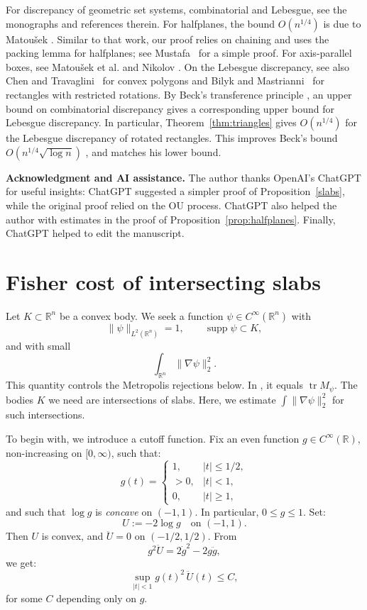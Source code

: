 \documentclass[12pt,reqno]{amsart}
\def\le{\leqslant}
\def\ge{\geqslant}\def\geq{\geqslant}
\def\le{\leqslant}
\theoremstyle{remark}
\numberwithin{equation}{section}
\def \R {\mathbb{R}}
\begin{document}
For discrepancy of geometric set systems, combinatorial and Lebesgue, see the monographs \cite{Mat, Chaz, Beck-Chen} and references therein. For halfplanes, the bound \(O(n^{1/4})\) is due to Matou\v{s}ek \cite{Mat-halfspaces}. Similar to that work, our proof relies on chaining and uses the packing lemma for halfplanes; see Mustafa~\cite{Mustafa} for a simple proof. For axis-parallel boxes, see Matou\v{s}ek et al. \cite{MNT} and 
Nikolov \cite{Nikolov}. On the Lebesgue discrepancy, see also Chen and Travaglini~\cite{ChenTrav} for convex polygons and Bilyk and Mastrianni~\cite{BilykMast} for rectangles with restricted rotations. By Beck's transference principle \cite{Beck-1}, an upper bound on combinatorial discrepancy gives a corresponding upper bound for Lebesgue discrepancy. In particular, Theorem~\ref{thm:triangles} gives \(O(n^{1/4})\) for the Lebesgue discrepancy of rotated rectangles. This improves Beck's bound \(O(n^{1/4}\sqrt{\log n})\) \cite{Beck-Chen}, and matches his lower bound.
\smallskip%

\textbf{Acknowledgment and AI assistance.} 
The author thanks OpenAI's ChatGPT for useful insights: ChatGPT suggested a simpler proof of Proposition~\ref{slabs}, while the original proof relied on the OU process. ChatGPT also helped the author with estimates in the proof of Proposition~\ref{prop:halfplanes}. Finally, ChatGPT helped to edit the manuscript.


\section{Fisher cost of intersecting slabs}\label{sec:slabs}

Let \(K\subset\R^n\) be a convex body. We seek a function \(\psi\in C^\infty(\R^n)\) with
\[
\|\psi\|_{L^2(\R^n)}=1,\qquad
\operatorname{supp}\psi\subset K,
\]
and with small
\[
\int_{\R^n}\|\nabla\psi\|_2^2.
\]
This quantity controls the Metropolis rejections below. In \cite{Versh-Sm-3}, it equals \(\operatorname{tr}M_\psi\). The bodies \(K\) we need are intersections of slabs. Here, we estimate \(\int\|\nabla\psi\|_2^2\) for such intersections.
\smallskip%

To begin with, we introduce a cutoff function. 
Fix an even function \(g\in C^\infty(\R)\), non-increasing on \([0,\infty)\), such that:
\[
g(t)=\begin{cases}
1, & |t|\le 1/2,\\
>0, & |t|<1,\\
0, & |t|\ge 1,
\end{cases}
\]
and such that \(\log g\) is \emph{concave} 
on \((-1,1)\). In particular, \(0\le g\le 1\). Set:
\[
U:=-2\log g\quad\text{on }(-1,1).
\]
Then \(U\) is convex, and \(\ddot U=0\) on \((-1/2,1/2)\). From
\[
g^2\ddot U=2\dot g^2-2g\ddot g,
\]
we get:
\begin{equation}\label{eq:gU}
\sup_{|t|<1}g(t)^2\,\ddot U(t)\le C,
\end{equation}
for some \(C\) depending only on \(g\).
\end{document}
